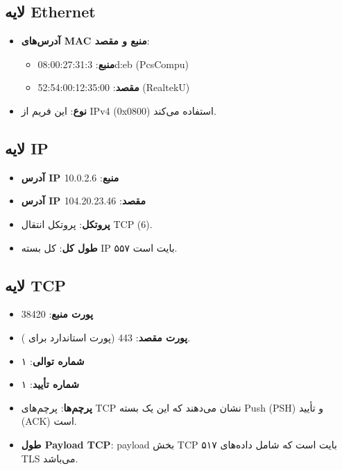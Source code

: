 \subsection*{لایه Ethernet}
\begin{itemize}[label={--}]
    \item \textbf{آدرس‌های MAC منبع و مقصد}:
    \begin{itemize}
        \item \textbf{منبع}: 08:00:27:31:3d:eb (PcsCompu)
        \item \textbf{مقصد}: 52:54:00:12:35:00 (RealtekU)
    \end{itemize}
    \item \textbf{نوع}: این فریم از IPv4 (0x0800) استفاده می‌کند.
\end{itemize}

\subsection*{لایه IP}
\begin{itemize}[label={--}]
    \item \textbf{آدرس IP منبع}: 10.0.2.6
    \item \textbf{آدرس IP مقصد}: 104.20.23.46
    \item \textbf{پروتکل}: پروتکل انتقال TCP (6).
    \item \textbf{طول کل}: کل بسته IP ۵۵۷ بایت است.
\end{itemize}

\subsection*{لایه TCP}
\begin{itemize}[label={--}]
    \item \textbf{پورت منبع}: 38420
    \item \textbf{پورت مقصد}: 443 (پورت استاندارد برای ).
    \item \textbf{شماره توالی}: ۱
    \item \textbf{شماره تأیید}: ۱
    \item \textbf{پرچم‌ها}: پرچم‌های TCP نشان می‌دهند که این یک بسته Push (PSH) و تأیید (ACK) است.
    \item \textbf{طول Payload TCP}: payload بخش TCP ۵۱۷ بایت است که شامل داده‌های TLS می‌باشد.
\end{itemize}

